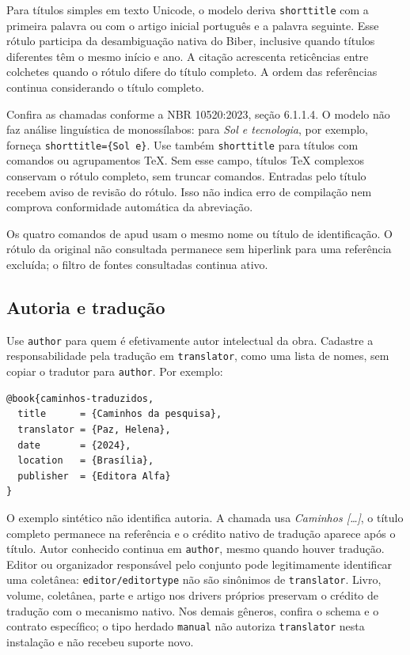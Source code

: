 Para títulos simples em texto Unicode, o modelo deriva \texttt{shorttitle}
com a primeira palavra ou com o artigo inicial português e a palavra
seguinte. Esse rótulo participa da desambiguação nativa do Biber, inclusive
quando títulos diferentes têm o mesmo início e ano. A citação acrescenta
reticências entre colchetes quando o rótulo difere do título completo.
A ordem das referências continua considerando o título completo.

Confira as chamadas conforme a NBR 10520:2023, seção 6.1.1.4. O modelo
não faz análise linguística de monossílabos: para \emph{Sol e tecnologia},
por exemplo, forneça \verb|shorttitle={Sol e}|. Use também \texttt{shorttitle}
para títulos com comandos ou agrupamentos TeX. Sem esse campo, títulos
TeX complexos conservam o rótulo completo, sem truncar comandos.
Entradas pelo título recebem aviso de revisão do rótulo. Isso não indica
erro de compilação nem comprova conformidade automática da abreviação.

Os quatro comandos de apud usam o mesmo nome ou título de identificação.
O rótulo da original não consultada permanece sem hiperlink para uma
referência excluída; o filtro de fontes consultadas continua ativo.

\subsection*{Autoria e tradução}

Use \texttt{author} para quem é efetivamente autor intelectual da obra.
Cadastre a responsabilidade pela tradução em \texttt{translator}, como uma
lista de nomes, sem copiar o tradutor para \texttt{author}. Por exemplo:
\begin{verbatim}
@book{caminhos-traduzidos,
  title      = {Caminhos da pesquisa},
  translator = {Paz, Helena},
  date       = {2024},
  location   = {Brasília},
  publisher  = {Editora Alfa}
}
\end{verbatim}

O exemplo sintético não identifica autoria. A chamada usa
\emph{Caminhos [\ldots]}, o título completo permanece na referência e
o crédito nativo de tradução aparece após o título. Autor conhecido continua
em \texttt{author}, mesmo quando houver tradução. Editor ou organizador
responsável pelo conjunto pode legitimamente identificar uma coletânea:
\texttt{editor/editortype} não são sinônimos de \texttt{translator}.
Livro, volume, coletânea, parte e artigo nos drivers próprios preservam o
crédito de tradução com o mecanismo nativo. Nos demais gêneros, confira o
schema e o contrato específico; o tipo herdado \texttt{manual} não autoriza
\texttt{translator} nesta instalação e não recebeu suporte novo.

